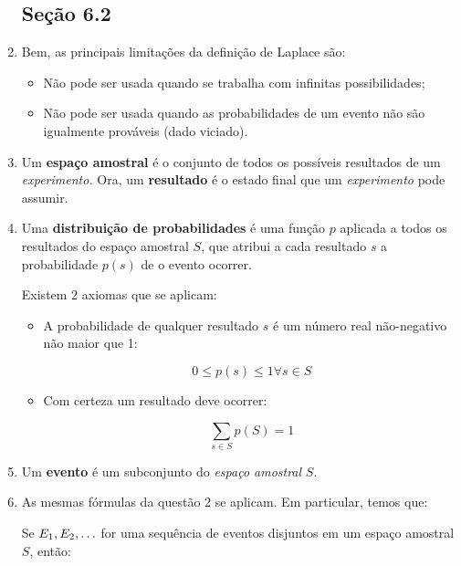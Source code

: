 \documentclass{article}
\begin{document}
\begin{enumerate}
        \subsection*{Seção 6.2}

    \item Bem, as principais limitações da definição de Laplace são: 
        \begin{itemize}
            \item Não pode ser usada quando se trabalha com infinitas possibilidades;
            \item Não pode ser usada quando as probabilidades de um evento não são igualmente prováveis (dado viciado).
        \end{itemize}

    \item Um \textbf{espaço amostral} é o conjunto de todos os possíveis resultados de um \textit{experimento.} Ora, um \textbf{resultado} é o estado final que um \textit{experimento} pode assumir.

    \item Uma \textbf{distribuição de probabilidades} é uma função \( p \) aplicada a todos os resultados do espaço amostral \( S \), que atribui a cada resultado \( s \) a probabilidade \( p(s) \) de o evento ocorrer.

        Existem 2 axiomas que se aplicam:

        \begin{itemize}
            \item A probabilidade de qualquer resultado \( s \) é um número real não-negativo não maior que 1:

                \[ 0 \leq p(s) \leq 1 \forall s \in S \] 

            \item Com certeza um resultado deve ocorrer:

                \[ \sum_{s \in S} p(S) = 1 \] 

        \end{itemize}

    \item Um \textbf{evento} é um subconjunto do \textit{espaço amostral} \( S \).

    \item As mesmas fórmulas da questão 2 se aplicam. Em particular, temos que:

        Se \( E_1, E_2, \mathellipsis \) for uma sequência de eventos disjuntos em um espaço amostral \( S \), então:


\end{enumerate}
\end{document}
